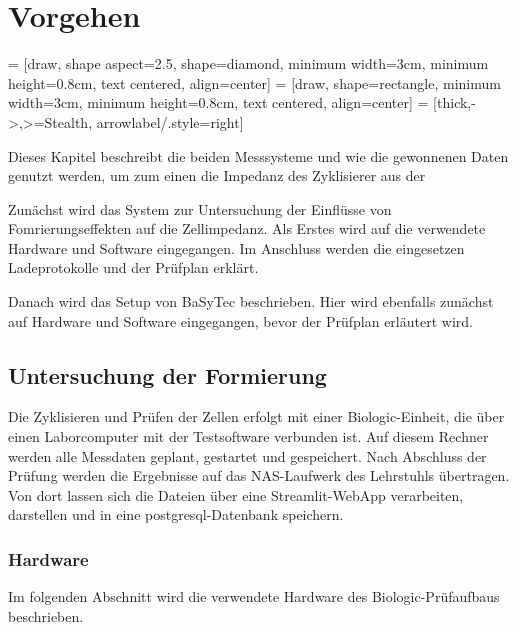 \chapter{Vorgehen}%
\label{chap:GrundlagenundMethoden}%

 = [draw, shape aspect=2.5, shape=diamond, minimum width=3cm, minimum height=0.8cm, text centered, align=center]
 = [draw, shape=rectangle, minimum width=3cm, minimum height=0.8cm, text centered, align=center]
 = [thick,->,>=Stealth, arrowlabel/.style={right}]

Dieses Kapitel beschreibt die beiden Messsysteme und wie die gewonnenen Daten genutzt werden, um zum einen die
Impedanz des Zyklisierer aus der

Zunächst wird das System zur Untersuchung der Einflüsse von Fomrierungseffekten auf die Zellimpedanz.
Als Erstes wird auf die verwendete Hardware und Software eingegangen.
Im Anschluss werden die eingesetzen Ladeprotokolle und der Prüfplan erklärt.

Danach wird das Setup von BaSyTec beschrieben.
Hier wird ebenfalls zunächst auf Hardware und Software eingegangen, bevor der Prüfplan erläutert wird.

\section{Untersuchung der Formierung}
\label{sec:form}
Die Zyklisieren und Prüfen der Zellen erfolgt mit einer Biologic-Einheit, die über einen Laborcomputer mit der Testsoftware verbunden ist.
Auf diesem Rechner werden alle Messdaten geplant, gestartet und gespeichert.
Nach Abschluss der Prüfung werden die Ergebnisse auf das NAS-Laufwerk des Lehrstuhls übertragen.
Von dort lassen sich die Dateien über eine Streamlit-WebApp verarbeiten, darstellen und in eine postgresql-Datenbank
speichern.

\subsection{Hardware}
\label{subsec:hardware-bio}
Im folgenden Abschnitt wird die verwendete Hardware des Biologic-Prüfaufbaus beschrieben.
